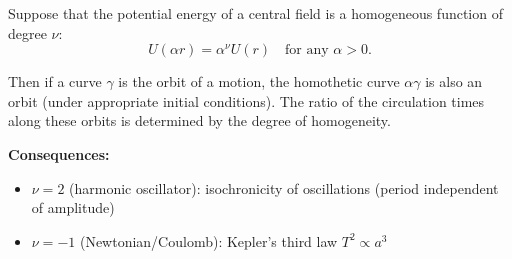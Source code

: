 Suppose that the potential energy of a central field is a homogeneous function of degree $\nu$:
$$U(\alpha r) = \alpha^\nu U(r) \quad \text{for any } \alpha > 0.$$

Then if a curve $\gamma$ is the orbit of a motion, the homothetic curve $\alpha \gamma$ is also an orbit (under appropriate initial conditions). The ratio of the circulation times along these orbits is determined by the degree of homogeneity.

\textbf{Consequences:}
\begin{itemize}
\item $\nu = 2$ (harmonic oscillator): isochronicity of oscillations (period independent of amplitude)
\item $\nu = -1$ (Newtonian/Coulomb): Kepler's third law $T^2 \propto a^3$
\end{itemize}
